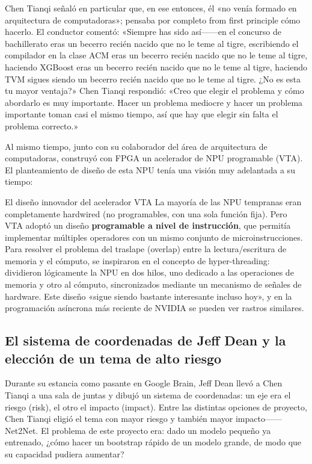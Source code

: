 Chen Tianqi señaló en particular que, en ese entonces, él «no venía formado en arquitectura de computadoras»; pensaba por completo from first principle cómo hacerlo. El conductor comentó: «Siempre has sido así------en el concurso de bachillerato eras un becerro recién nacido que no le teme al tigre, escribiendo el compilador en la clase ACM eras un becerro recién nacido que no le teme al tigre, haciendo XGBoost eras un becerro recién nacido que no le teme al tigre, haciendo TVM sigues siendo un becerro recién nacido que no le teme al tigre. ¿No es esta tu mayor ventaja?» Chen Tianqi respondió: «Creo que elegir el problema y cómo abordarlo es muy importante. Hacer un problema mediocre y hacer un problema importante toman casi el mismo tiempo, así que hay que elegir sin falta el problema correcto.»

Al mismo tiempo, junto con su colaborador del área de arquitectura de computadoras, construyó con FPGA un acelerador de NPU programable (VTA). El planteamiento de diseño de esta NPU tenía una visión muy adelantada a su tiempo:

\begin{knowledgebox}{El diseño innovador del acelerador VTA}
La mayoría de las NPU tempranas eran completamente hardwired (no programables, con una sola función fija). Pero VTA adoptó un diseño \textbf{programable a nivel de instrucción}, que permitía implementar múltiples operadores con un mismo conjunto de microinstrucciones. Para resolver el problema del traslape (overlap) entre la lectura/escritura de memoria y el cómputo, se inspiraron en el concepto de hyper-threading: dividieron lógicamente la NPU en dos hilos, uno dedicado a las operaciones de memoria y otro al cómputo, sincronizados mediante un mecanismo de señales de hardware. Este diseño «sigue siendo bastante interesante incluso hoy», y en la programación asíncrona más reciente de NVIDIA se pueden ver rastros similares.
\end{knowledgebox}

\subsection{El sistema de coordenadas de Jeff Dean y la elección de un tema de alto riesgo}

Durante su estancia como pasante en Google Brain, Jeff Dean llevó a Chen Tianqi a una sala de juntas y dibujó un sistema de coordenadas: un eje era el riesgo (risk), el otro el impacto (impact). Entre las distintas opciones de proyecto, Chen Tianqi eligió el tema con mayor riesgo y también mayor impacto------Net2Net. El problema de este proyecto era: dado un modelo pequeño ya entrenado, ¿cómo hacer un bootstrap rápido de un modelo grande, de modo que su capacidad pudiera aumentar?

